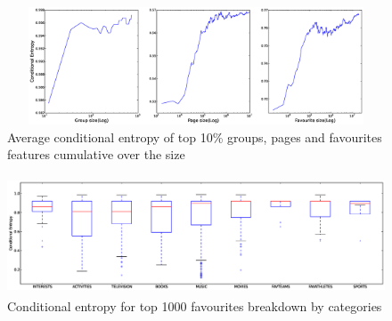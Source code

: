 \begin{figure}[tbp!]
\centering
\includegraphics[width=160mm,height=35mm]{data/plots/cumulativeEntropy/cumulative.eps}
\caption{Average conditional entropy of top 10\% groups, pages and favourites features cumulative over the size }
\label{Fig4}
\end{figure}

\begin{figure}[tbp!]
\centering
\includegraphics[width=160mm, height=35mm]{data/plots/boxPlots/CEvsFavTypes.eps}
\caption{Conditional entropy for top 1000 favourites breakdown by categories}
\label{Fig5}
\end{figure}
